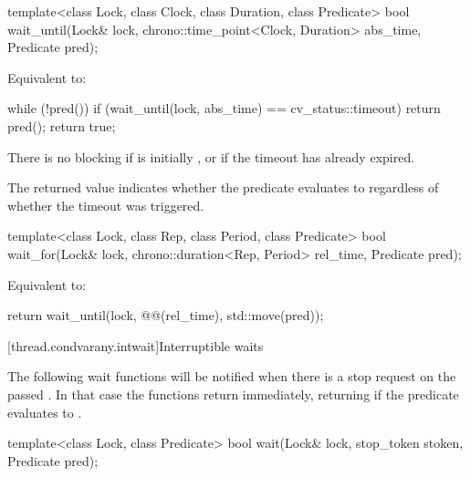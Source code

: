 %
\begin{itemdecl}
template<class Lock, class Clock, class Duration, class Predicate>
  bool wait_until(Lock& lock, chrono::time_point<Clock, Duration> abs_time, Predicate pred);
\end{itemdecl}

\begin{itemdescr}
\pnum
\effects
Equivalent to:
\begin{codeblock}
while (!pred())
  if (wait_until(lock, abs_time) == cv_status::timeout)
    return pred();
return true;
\end{codeblock}

\pnum
\begin{note}
There is no blocking if  is initially , or
if the timeout has already expired.
\end{note}

\pnum
\begin{note}
The returned value indicates whether the predicate evaluates to 
regardless of whether the timeout was triggered.
\end{note}
\end{itemdescr}

%
\begin{itemdecl}
template<class Lock, class Rep, class Period, class Predicate>
  bool wait_for(Lock& lock, chrono::duration<Rep, Period> rel_time, Predicate pred);
\end{itemdecl}

\begin{itemdescr}
\pnum
\effects
Equivalent to:
\begin{codeblock}
return wait_until(lock, @@(rel_time), std::move(pred));
\end{codeblock}
\end{itemdescr}

[thread.condvarany.intwait]{Interruptible waits}

\pnum
The following wait functions will be notified
when there is a stop request on the passed .
In that case the functions return immediately,
returning  if the predicate evaluates to .

\begin{itemdecl}
template<class Lock, class Predicate>
  bool wait(Lock& lock, stop_token stoken, Predicate pred);
\end{itemdecl}

